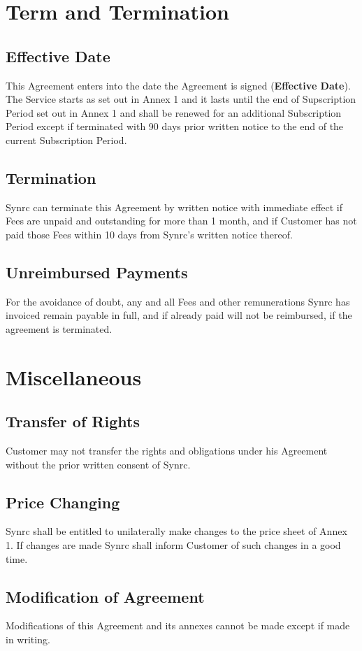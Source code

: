\documentclass[11pt,oneside]{article}
\begin{document}
\section{Term and Termination}
\subsection{Effective Date}
This Agreement enters into the date the Agreement is signed ({\bf Effective Date}).
The Service starts as set out in Annex 1 and it lasts until the end of Supscription Period
set out in Annex 1 and shall be renewed for an additional Subscription Period except if
terminated with 90 days prior written notice to the end of the current Subscription Period.
\subsection{Termination}
Synrc can terminate this Agreement by written notice with immediate effect if Fees
are unpaid and outstanding for more than 1 month, and if Customer has not paid those Fees
within 10 days from Synrc's written notice thereof.
\subsection{Unreimbursed Payments}
For the avoidance of doubt, any and all Fees and other remunerations Synrc has
invoiced remain payable in full, and if already paid will not be reimbursed,
if the agreement is terminated.

\newpage
\section{Miscellaneous}
\subsection{Transfer of Rights}
Customer may not transfer the rights and obligations under his Agreement
without the prior written consent of Synrc.
\subsection{Price Changing}
Synrc shall be entitled to unilaterally make changes to the price sheet of Annex 1.
If changes are made Synrc shall inform Customer of such changes in a good time.
\subsection{Modification of Agreement}
Modifications of this Agreement and its annexes cannot be made except
if made in writing.
\end{document}

